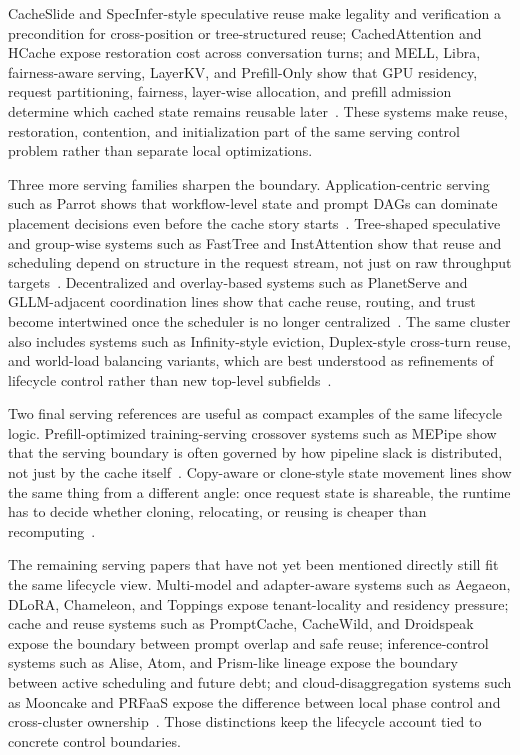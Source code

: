 CacheSlide and SpecInfer-style speculative reuse make legality and verification a precondition for cross-position or tree-structured reuse; CachedAttention and HCache expose restoration cost across conversation turns; and MELL, Libra, fairness-aware serving, LayerKV, and Prefill-Only show that GPU residency, request partitioning, fairness, layer-wise allocation, and prefill admission determine which cached state remains reusable later~\cite{cacheslide2025,miao2024specinfer,gao2025cachedattention,gao2025hcache,liu2025mell,ruan2026libra,sheng2024fairnessserving,xiong2024layerkv,du2025prefillonly}. These systems make reuse, restoration, contention, and initialization part of the same serving control problem rather than separate local optimizations.

Three more serving families sharpen the boundary. Application-centric serving such as Parrot shows that workflow-level state and prompt DAGs can dominate placement decisions even before the cache story starts~\cite{lin2024parrot}. Tree-shaped speculative and group-wise systems such as FastTree and InstAttention show that reuse and scheduling depend on structure in the request stream, not just on raw throughput targets~\cite{pan2025fasttree,pan2025instattention}. Decentralized and overlay-based systems such as PlanetServe and GLLM-adjacent coordination lines show that cache reuse, routing, and trust become intertwined once the scheduler is no longer centralized~\cite{fang2026planetserve}. The same cluster also includes systems such as Infinity-style eviction, Duplex-style cross-turn reuse, and world-load balancing variants, which are best understood as refinements of lifecycle control rather than new top-level subfields~\cite{infinigen2024,yun2024duplex,wang2025wlbllm}.

Two final serving references are useful as compact examples of the same lifecycle logic. Prefill-optimized training-serving crossover systems such as MEPipe show that the serving boundary is often governed by how pipeline slack is distributed, not just by the cache itself~\cite{sun2025mepipe}. Copy-aware or clone-style state movement lines show the same thing from a different angle: once request state is shareable, the runtime has to decide whether cloning, relocating, or reusing is cheaper than recomputing~\cite{tian2025clone}.

The remaining serving papers that have not yet been mentioned directly still fit the same lifecycle view. Multi-model and adapter-aware systems such as Aegaeon, DLoRA, Chameleon, and Toppings expose tenant-locality and residency pressure; cache and reuse systems such as PromptCache, CacheWild, and Droidspeak expose the boundary between prompt overlap and safe reuse; inference-control systems such as Alise, Atom, and Prism-like lineage expose the boundary between active scheduling and future debt; and cloud-disaggregation systems such as Mooncake and PRFaaS expose the difference between local phase control and cross-cluster ownership~\cite{xiang2025aegaeon,wu2024dlora,iliakopoulou2024chameleon,li2025toppings,gim2024promptcache,wang2025kvcachewild,liu2026droidspeak,zhao2024alise,zhao2024atom,yu2025prism,qin2026prfaas}. Those distinctions keep the lifecycle account tied to concrete control boundaries.

